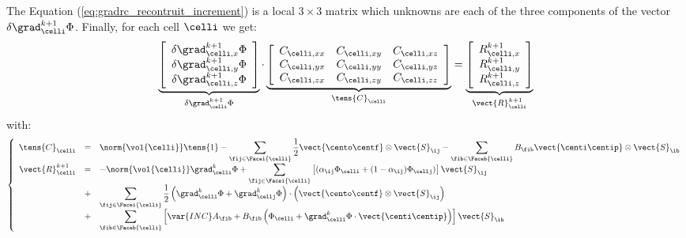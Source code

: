 The Equation (\ref{eq:gradrc_recontruit_increment}) is a local $3 \times 3$ matrix which unknowns are each of the three components of 
the vector $\delta \grad_\celli^{k+1} \Phi$. Finally, for each cell $\celli$ we get:
%
\begin{equation}\label{eq:eq_systeme_matriciel_gradrc}
\underbrace{
\left[\begin{array}{c}
\delta \grad_{\celli ,x}^{k+1} \Phi\\
\delta \grad_{\celli ,y}^{k+1} \Phi\\ 
\delta \grad_{\celli ,z}^{k+1} \Phi
\end{array}\right]
}_{\delta \grad_\celli^{k+1} \Phi }
\cdot
\underbrace{
\left[\begin{array}{ccc}
\displaystyle
  C_{\celli , xx}
& C_{\celli , xy}
& C_{\celli , xz}\\
\displaystyle
  C_{\celli , yx}
& C_{\celli , yy}
& C_{\celli , yz}\\
\displaystyle
  C_{\celli , zx}
& C_{\celli , zy}
& C_{\celli , zz}
\end{array}\right]
}_{\tens{C}_{\celli}}
=
\underbrace{
\left[\begin{array}{c}
\displaystyle
R^{k+1}_{\celli ,x}\\
\displaystyle
R^{k+1}_{\celli ,y}\\
\displaystyle
R^{k+1}_{\celli ,z}
\end{array}\right]
}_{\vect{R}^{k+1}_{\celli}}
\end{equation}
%
with:
%
\begin{equation}\label{eq:eq_second_membre_gradrc}
\left\{\begin{array}{rcl}
\tens{C}_\celli  &=& 
\displaystyle
\norm{\vol{\celli}} \tens{1} - 
\sum\limits_{ \fij \in \Facei{\celli}} \frac{1}{2}  \vect{\cento \centf} \otimes \vect{S}_{\ij} -
\sum\limits_{ \fib \in \Faceb{\celli}} B_{\fib} \vect{\centi \centip}  \otimes \vect{S}_{\ib} \\
\vect{R}^{k+1}_{\celli} &=&
\displaystyle 
 -\norm{\vol{\celli}}  \grad_{\celli}^{k} \Phi +
\sum\limits_{\fij \in \Facei{\celli}}\left[
(\alpha_{\ij} \Phi_\celli + (1 - \alpha_{\ij}) \Phi_\cellj)\right] \vect{S}_{\ij} \\
&+& \displaystyle
\sum\limits_{\fij \in \Facei{\celli}} \frac{1}{2} 
\left(\grad_\celli^k \Phi + \grad_\cellj^k \Phi \right) \cdot \left( \vect{\cento \centf} \otimes \vect{S}_{\ij} \right) \\
&+& \displaystyle 
\sum\limits_{\fib \in \Faceb{\celli}}\left[ \var{INC} A_{\fib} 
+ B_{\fib} \left( \Phi_\celli + \grad_\celli^k \Phi \cdot \vect{\centi \centip} \right)  \right] \vect{S}_{\ib}
\end{array}\right.
\end{equation}

